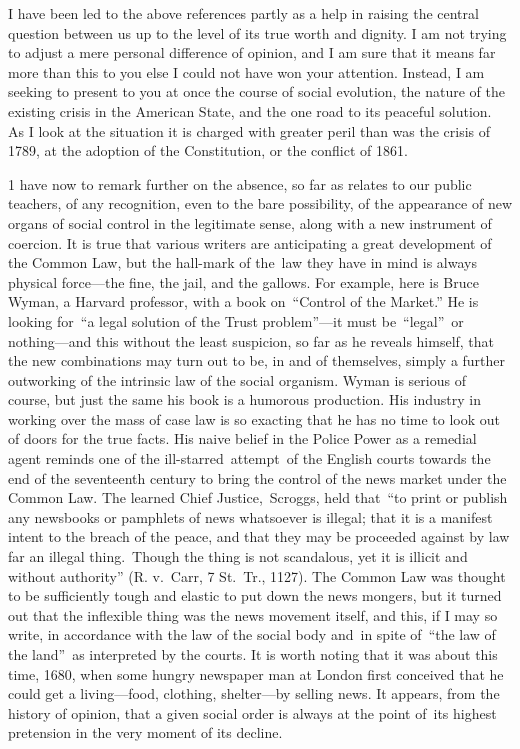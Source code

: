 \documentclass[openany,nobib]{tufte-book}
\begin{document}
I have been led to the above references partly as a help in raising the
central question between us up to the level of its true worth and
dignity. I am not trying to adjust a mere personal difference of
opinion, and I am sure that it means far more than this to you else I
could not have won your attention. Instead, I am seeking to present to
you at once the course of social evolution, the nature of the existing
crisis in the American State, and the one road to its peaceful solution.
As I look at the situation it is charged with greater peril than was the
crisis of 1789, at the adoption of the Constitution, or the conflict of
1861.~

1 have now to remark further on the absence, so far as relates to our
public teachers, of any recognition, even to the bare possibility, of
the appearance of new organs of social control in the legitimate sense,
along with a new instrument of coercion. It is true that various writers
are anticipating a great development of the Common Law, but the
hall-mark of the~law they have in mind is always physical force---the
fine, the jail, and the gallows. For example, here is Bruce Wyman, a
Harvard professor, with a book on~``Control of the Market.'' He is
looking for~``a legal solution of the Trust problem''---it must
be~``legal''~or nothing---and this without the least suspicion, so far
as he reveals himself, that the new combinations may turn out to be, in
and of themselves, simply a further outworking of the intrinsic law of
the social organism. Wyman is serious of course, but just the same his
book is a humorous production. His industry in working over the mass of
case law is so exacting that he has no time to look out of doors for the
true facts. His naive belief in the Police Power as a remedial agent
reminds one of the ill-starred~attempt~of the English courts towards the
end of the seventeenth century to bring the control of the news market
under the Common Law. The learned Chief Justice,~Scroggs, held that~``to
print or publish any newsbooks or pamphlets of news whatsoever is
illegal; that it is a manifest intent to the breach of the peace, and
that they may be proceeded against by law far an illegal thing.~Though
the thing is not scandalous, yet it is illicit and without authority''
(R. v.~Carr, 7 St.~Tr., 1127). The Common Law was thought to be
sufficiently tough and elastic to put down the news mongers, but it
turned out that the inflexible thing was the news movement itself, and
this, if I may so write, in accordance with the law of the social body
and~in spite of~``the law of the land''~as interpreted by the courts. It
is worth noting that it was about this time, 1680, when some hungry
newspaper man at London first conceived that he could get a
living---food, clothing, shelter---by selling news. It appears, from the
history of opinion, that a given social order is always at the point
of~its highest pretension in the very moment of its decline.~~
\end{document}
